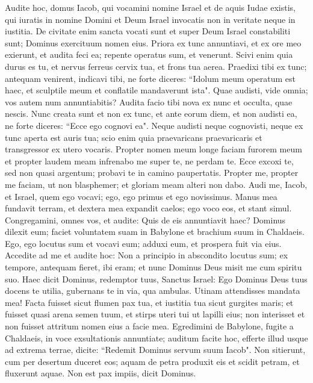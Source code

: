 \begin{biblechapter}  
\verse Audite hoc, domus Iacob, qui vocamini nomine Israel et de aquis Iudae existis, qui iuratis in nomine Domini et Deum Israel invocatis non in veritate neque in iustitia. 
\verse De civitate enim sancta vocati sunt et super Deum Israel constabiliti sunt; Dominus exercituum nomen eius. 
\verse Priora ex tunc annuntiavi, et ex ore meo exierunt, et audita feci ea; repente operatus sum, et venerunt. 
\verse Scivi enim quia durus es tu, et nervus ferreus cervix tua, et frons tua aerea. 
\verse Praedixi tibi ex tunc; antequam venirent, indicavi tibi, ne forte diceres: “Idolum meum operatum est haec, et sculptile meum et conflatile mandaverunt ista". 
\verse Quae audisti, vide omnia; vos autem num annuntiabitis? Audita facio tibi nova ex nunc et occulta, quae nescis. 
\verse Nunc creata sunt et non ex tunc, et ante eorum diem, et non audisti ea, ne forte diceres: “Ecce ego cognovi ea". 
\verse Neque audisti neque cognovisti, neque ex tunc aperta est auris tua; scio enim quia praevaricans praevaricaris et transgressor ex utero vocaris. 
\verse Propter nomen meum longe faciam furorem meum et propter laudem meam infrenabo me super te, ne perdam te. 
\verse Ecce excoxi te, sed non quasi argentum; probavi te in camino paupertatis. 
\verse Propter me, propter me faciam, ut non blasphemer; et gloriam meam alteri non dabo. 
\verse Audi me, Iacob, et Israel, quem ego vocavi; ego, ego primus et ego novissimus. 
\verse Manus mea fundavit terram, et dextera mea expandit caelos; ego voco eos, et stant simul. 
\verse Congregamini, omnes vos, et audite: Quis de eis annuntiavit haec? Dominus dilexit eum; faciet voluntatem suam in Babylone et brachium suum in Chaldaeis. 
\verse Ego, ego locutus sum et vocavi eum; adduxi eum, et prospera fuit via eius. 
\verse Accedite ad me et audite hoc: Non a principio in abscondito locutus sum; ex tempore, antequam fieret, ibi eram; et nunc Dominus Deus misit me cum spiritu suo. 
\verse Haec dicit Dominus, redemptor tuus, Sanctus Israel: Ego Dominus Deus tuus docens te utilia, gubernans te in via, qua ambulas. 
\verse Utinam attendisses mandata mea! Facta fuisset sicut flumen pax tua, et iustitia tua sicut gurgites maris; 
\verse et fuisset quasi arena semen tuum, et stirps uteri tui ut lapilli eius; non interisset et non fuisset attritum nomen eius a facie mea. 
\verse Egredimini de Babylone, fugite a Chaldaeis, in voce exsultationis annuntiate; auditum facite hoc, efferte illud usque ad extrema terrae, dicite: “Redemit Dominus servum suum Iacob". 
\verse Non sitierunt, cum per desertum duceret eos; aquam de petra produxit eis et scidit petram, et fluxerunt aquae. 
\verse Non est pax impiis, dicit Dominus. 
\end{biblechapter}


